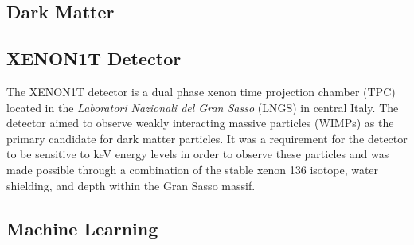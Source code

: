 \subsection{Dark Matter}
\subsection{XENON1T Detector}
The XENON1T detector is a dual phase xenon time projection chamber (TPC) located in the \textit{Laboratori Nazionali del Gran Sasso} (LNGS) in central Italy.
The detector aimed to observe weakly interacting massive particles (WIMPs) as the primary candidate for dark matter particles.
It was a requirement for the detector to be sensitive to keV energy levels in order to observe these particles and was made possible through a combination of the stable xenon 136 isotope, water shielding, and depth within the Gran Sasso massif.
\subsection{Machine Learning}
